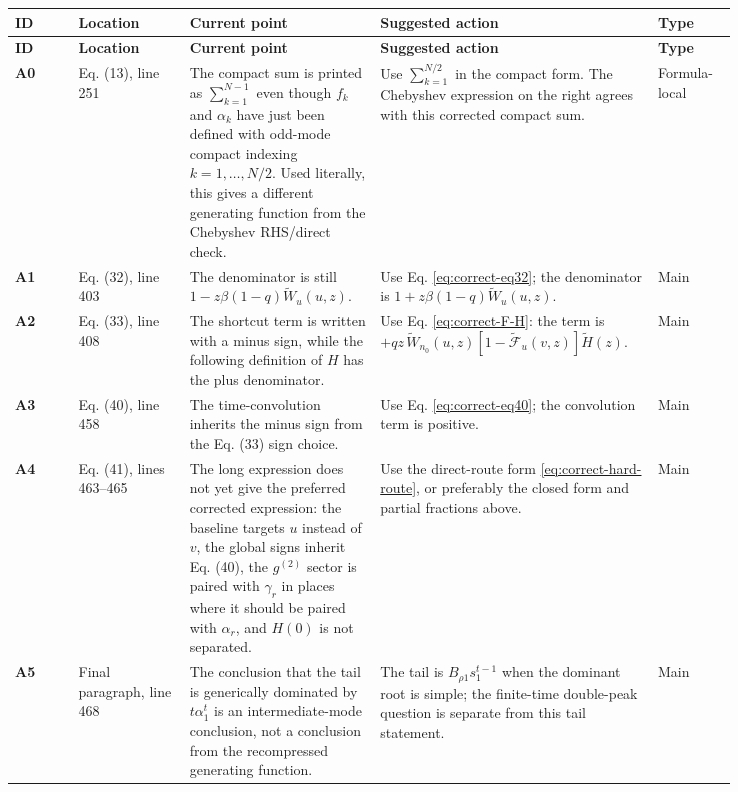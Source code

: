 \documentclass[11pt]{article}
\newcommand{\wt}{\widetilde}
\newcommand{\Fcal}{\mathcal{F}}
\newcommand{\issue}[1]{\textbf{#1}}
\begin{document}
\small
\begin{longtable}{@{}L{0.08\linewidth}L{0.14\linewidth}L{0.24\linewidth}L{0.28\linewidth}L{0.10\linewidth}@{}}
\toprule
\textbf{ID} & \textbf{Location} & \textbf{Current point} &
\textbf{Suggested action} & \textbf{Type}\\
\midrule
\endfirsthead
\toprule
\textbf{ID} & \textbf{Location} & \textbf{Current point} &
\textbf{Suggested action} & \textbf{Type}\\
\midrule
\endhead

\issue{A0} & Eq. (13), line 251 &
The compact sum is printed as \(\sum_{k=1}^{N-1}\) even though \(f_k\) and
\(\alpha_k\) have just been defined with odd-mode compact indexing
\(k=1,\ldots,N/2\).  Used literally, this gives a different generating
function from the Chebyshev RHS/direct check. &
Use \(\sum_{k=1}^{N/2}\) in the compact form.  The Chebyshev expression on the
right agrees with this corrected compact sum. &
\textcolor{hard}{Formula-local}\\

\issue{A1} & Eq. (32), line 403 &
The denominator is still \(1-z\beta(1-q)\wt W_u(u,z)\). &
Use Eq. \eqref{eq:correct-eq32}; the denominator is
\(1+z\beta(1-q)\wt W_u(u,z)\). &
\textcolor{hard}{Main}\\

\issue{A2} & Eq. (33), line 408 &
The shortcut term is written with a minus sign, while the following definition
of \(H\) has the plus denominator. &
Use Eq. \eqref{eq:correct-F-H}: the term is
\(+qz\,\wt W_{n_0}(u,z)[1-\wt{\Fcal}_u(v,z)]\wt H(z)\). &
\textcolor{hard}{Main}\\

\issue{A3} & Eq. (40), line 458 &
The time-convolution inherits the minus sign from the Eq. (33) sign choice. &
Use Eq. \eqref{eq:correct-eq40}; the convolution term is positive. &
\textcolor{hard}{Main}\\

\issue{A4} & Eq. (41), lines 463--465 &
The long expression does not yet give the preferred corrected expression: the
baseline targets \(u\)
instead of \(v\), the global signs inherit Eq. (40), the \(g^{(2)}\) sector is
paired with \(\gamma_r\) in places where it should be paired with
\(\alpha_r\), and \(H(0)\) is not separated. &
Use the direct-route form \eqref{eq:correct-hard-route}, or preferably the
closed form and partial fractions above. &
\textcolor{hard}{Main}\\

\issue{A5} & Final paragraph, line 468 &
The conclusion that the tail is generically dominated by \(t\alpha_1^t\) is an
intermediate-mode conclusion, not a conclusion from the recompressed
generating function. &
The tail is \(B_{\rho1}s_1^{t-1}\) when the dominant root is simple; the
finite-time double-peak question is separate from this tail statement. &
\textcolor{hard}{Main}\\


\end{longtable}
\end{document}
